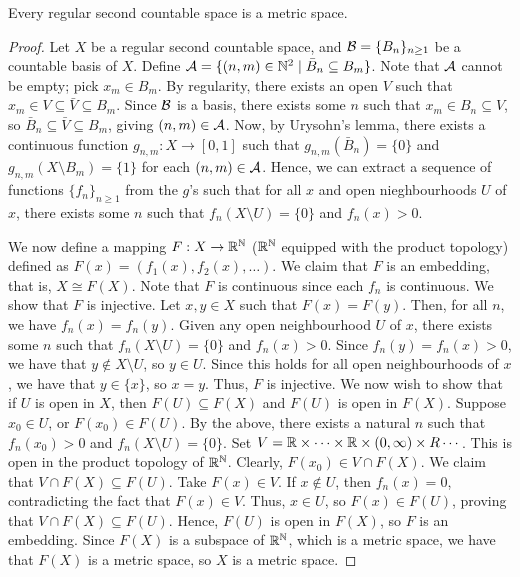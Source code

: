 \begin{theorem}
    Every regular second countable space is a metric space.
\end{theorem}
\begin{proof}
    Let $X$ be a regular second countable space, and $\mathcal{B} = \{B_{n}\}_{n \geq 1}$ be a countable basis of $X$. Define $\mathcal{A} = \{(n,m) \in \mathbb{N}^{2} \mid \bar{B}_{n} \subseteq B_{m}\}$. Note that $\mathcal{A}$ cannot be empty; pick $x_{m} \in B_{m}$. By regularity, there exists an open $V$ such that $x_{m} \in V \subseteq \bar{V} \subseteq B_{m}$. Since $\mathcal{B}$ is a basis, there exists some $n$ such that $x_{m} \in B_{n} \subseteq V$, so $\bar{B}_{n} \subseteq \bar{V} \subseteq B_{m}$, giving $(n,m) \in \mathcal{A}$. Now, by Urysohn's lemma, there exists a continuous function $g_{n,m} : X \to [0,1]$ such that $g_{n,m}(\bar{B}_{n}) = \{0\}$ and $g_{n,m}(X \setminus B_{m}) = \{1\}$ for each $(n,m) \in \mathcal{A}$. Hence, we can extract a sequence of functions $\{f_{n}\}_{n \geq 1}$ from the $g$'s such that for all $x$ and open nieghbourhoods $U$ of $x$, there exists some $n$ such that $f_{n}(X \setminus U) = \{0\}$ and $f_{n}(x) > 0$.

    We now define a mapping $F: X \to \mathbb{R}^{\mathbb{N}}$ ($\mathbb{R}^{\mathbb{N}}$ equipped with the product topology) defined as $F(x) = (f_{1}(x),f_{2}(x),\ldots)$. We claim that $F$ is an embedding, that is, $X \cong F(X)$. Note that $F$ is continuous since each $f_{n}$ is continuous. We show that $F$ is injective. Let $x,y \in X$ such that $F(x) = F(y)$. Then, for all $n$, we have $f_{n}(x) = f_{n}(y)$. Given any open neighbourhood $U$ of $x$, there exists some $n$ such that $f_{n}(X \setminus U) = \{0\}$ and $f_{n}(x) > 0$. Since $f_{n}(y) = f_{n}(x) > 0$, we have that $y \notin X \setminus U$, so $y \in U$. Since this holds for all open neighbourhoods of $x$, we have that $y \in \{x\}$, so $x = y$. Thus, $F$ is injective. We now wish to show that if $U$ is open in $X$, then $F(U) \subseteq F(X)$ and $F(U)$ is open in $F(X)$. Suppose $x_{0} \in U$, or $F(x_{0}) \in F(U)$. By the above, there exists a natural $n$ such that $f_{n}(x_{0}) > 0$ and $f_{n}(X \setminus U) = \{0\}$. Set $V = \mathbb{R} \times \cdots \times \mathbb{R} \times (0,\infty) \times R \cdots$. This is open in the product topology of $\mathbb{R}^{\mathbb{N}}$. Clearly, $F(x_{0}) \in V \cap F(X)$. We claim that $V \cap F(X) \subseteq F(U)$. Take $F(x) \in V$. If $x \notin U$, then $f_{n}(x) = 0$, contradicting the fact that $F(x) \in V$. Thus, $x \in U$, so $F(x) \in F(U)$, proving that $V \cap F(X) \subseteq F(U)$. Hence, $F(U)$ is open in $F(X)$, so $F$ is an embedding. Since $F(X)$ is a subspace of $\mathbb{R}^{\mathbb{N}}$, which is a metric space, we have that $F(X)$ is a metric space, so $X$ is a metric space.
\end{proof}

